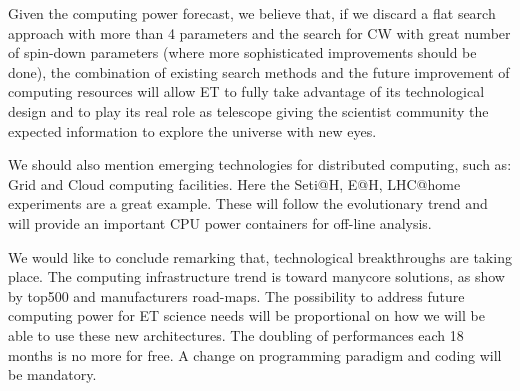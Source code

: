 Given the computing power forecast, we believe that, if we discard a flat search approach with more than 4 parameters and the  search for CW with great number of spin-down parameters (where more sophisticated improvements should be done), the combination of  existing search methods and the future improvement of computing resources will allow  ET to fully  take advantage of its technological design and to play its real role as telescope giving the scientist community the expected information to explore the universe with new eyes.

We should also mention emerging technologies for distributed computing, such as: Grid and Cloud computing facilities. Here the Seti@H, E@H, LHC@home experiments are a great example. These will follow the evolutionary trend and will provide an important CPU power containers for off-line analysis.

We would like to conclude remarking that, technological breakthroughs are taking place. The computing infrastructure trend is toward manycore solutions, as show by top500 and manufacturers road-maps. The possibility to address future computing power for ET science needs will be proportional on how we will be able to use these new architectures. The doubling of performances each 18 months is no more for free. A change on programming paradigm and coding will be mandatory.




\FloatBarrier
%
%
%
%





